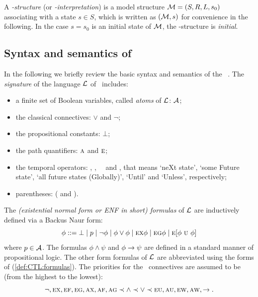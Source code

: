 \documentclass{article}
\begin{document}
A {\em \MPK-structure} (or {\em \MPK-interpretation}) is a model structure
${\cal M}=(S, R, L, s_0)$ associating
with a state $s\in S$, which is written as $({\cal M},s)$ for convenience in the following.
In the case $s=s_0$ is an initial state of $\cal M$, the \MPK-structure is {\em initial}.



\subsection{Syntax and semantics of \CTL}
In the following we briefly review the basic syntax and semantics
of the \CTL~\cite{DBLP:journals/toplas/ClarkeES86}.
The {\em signature} of the language $\cal L$ of \CTL\ includes:
\begin{itemize}
  \item a finite set of Boolean variables, called {\em atoms} of $\cal L$: $\cal A$;
  \item the classical connectives: $\lor$ and $\neg$;
  \item the propositional constants: $\bot$;
  \item the path quantifiers: $\textsc{a}$ and $\textsc{e}$;
  \item the temporal operators: \NEXT, \FUTURE, \GLOBAL\, \UNTIL\ and \UNLESS, that
  means `neXt state', `some Future state', `all future states (Globally)', `Until' and `Unless', respectively;
  \item parentheses: ( and ).
\end{itemize}

The {\em (existential normal form or ENF in short) formulas} of
$\cal L$ are inductively defined via a Backus Naur form:
\begin{equation}\label{def:CTL:formulas}
  \phi ::= \bot\mid p \mid\neg\phi \mid \phi\lor\phi \mid
    \EXIST \NEXT \phi \mid
    \EXIST \GLOBAL \phi \mid
    \EXIST [\phi\ \UNTIL\ \phi]%
\end{equation}
where $p\in\cal A$. The formulas $\phi\land\psi$ and $\phi\rightarrow\psi$
are defined in a standard manner of propositional logic.
The other form formulas of $\cal L$ are abbreviated
using the forms of (\ref{def:CTL:formulas}).
The priorities for the \CTL\ connectives are assumed to be (from the highest to the lowest):
\begin{equation*}
  \neg, \textsc{e}\textsc{x}, \textsc{e}\textsc{f}, \textsc{e}\textsc{g}, \textsc{a}\textsc{x}, \textsc{a}\textsc{f}, \textsc{a}\textsc{g}
  \prec \land \prec \lor \prec \textsc{e}\textsc{u}, \textsc{a}\textsc{u}, \textsc{e} \textsc{w}, \textsc{a} \textsc{w}, \rightarrow.
\end{equation*}
\end{document}
